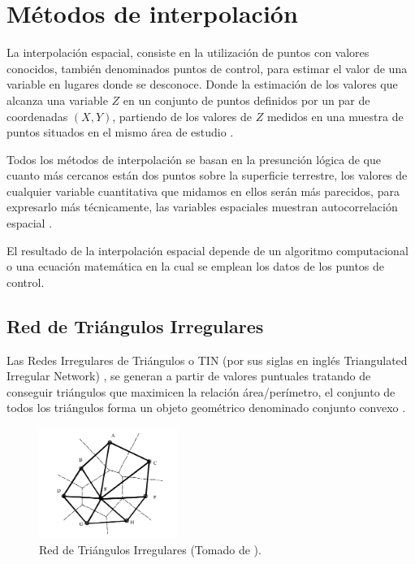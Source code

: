 \section{Métodos de interpolación}
\label{sec:cap2-metodos-interpolacion}
La interpolación espacial, consiste en la utilización de puntos con valores conocidos, también
denominados puntos de control, para estimar el valor de una variable en lugares donde se
desconoce. Donde la estimación de los valores que alcanza una variable $Z$ en un conjunto de
puntos definidos por un par de coordenadas $(X,Y)$, partiendo de los valores de $Z$ medidos en
una muestra de puntos situados en el mismo área de estudio \citep{fAlonsoSig2006}.


Todos los métodos de interpolación se basan en la presunción lógica de que cuanto más cercanos
están dos puntos sobre la superficie terrestre, los valores de cualquier variable cuantitativa que
midamos en ellos serán más parecidos, para expresarlo más técnicamente, las variables espaciales
muestran autocorrelación espacial \citep{fAlonsoSig2006}.

El resultado de la interpolación espacial depende de un algoritmo computacional o una ecuación
matemática en la cual se emplean los datos de los puntos de control\cite{NINO2011}.


\subsection {Red de Triángulos Irregulares}
Las Redes Irregulares de Triángulos o TIN (por sus siglas en inglés Triangulated Irregular Network)
, se generan a partir de valores puntuales tratando de conseguir triángulos que maximicen la
relación área/perímetro, el conjunto de todos los triángulos forma un objeto geométrico
denominado conjunto convexo \citet{fAlonsoSig2006}.

\begin{figure}[H]
\centering
\includegraphics[width=0.4\textwidth]{capitulo-2/graphics/TIN-cPachecoMDE2003.png}
\caption{\label{fig:sig-tin}Red de Triángulos Irregulares (Tomado de \cite{cPachecoMDE2003}).}
\end{figure}

